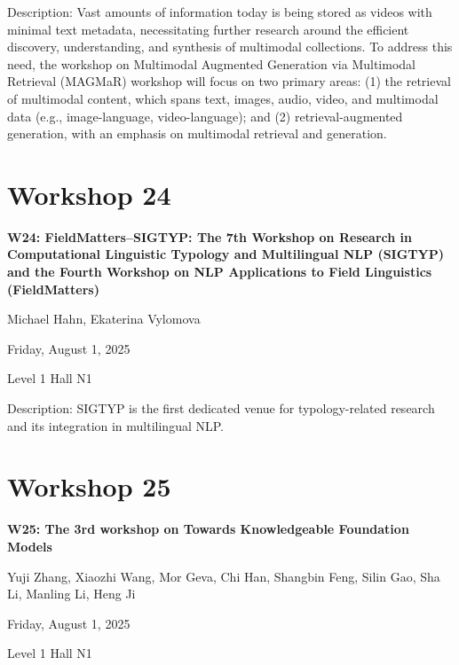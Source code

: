 Description: Vast amounts of information today is being stored as videos with minimal text metadata, necessitating further research around the efficient discovery, understanding, and synthesis of multimodal collections. To address this need, the workshop on Multimodal Augmented Generation via Multimodal Retrieval (MAGMaR) workshop will focus on two primary areas: (1) the retrieval of multimodal content, which spans text, images, audio, video, and multimodal data (e.g., image-language, video-language); and (2) retrieval-augmented generation, with an emphasis on multimodal retrieval and generation.

\clearpage


\section[W24: FieldMatters–SIGTYP: The 7th Workshop on Research in Computational Linguistic Typology and Multilingual NLP (SIGTYP) and the Fourth Workshop on NLP Applications to Field Linguistics (FieldMatters)]{Workshop 24}

\begin{center}
    {\Large \textbf{W24: FieldMatters–SIGTYP: The 7th Workshop on Research in Computational Linguistic Typology and Multilingual NLP (SIGTYP) and the Fourth Workshop on NLP Applications to Field Linguistics (FieldMatters)}}

Michael Hahn, Ekaterina Vylomova

    Friday, August 1, 2025

 Level 1 Hall N1
    
\end{center}

Description: SIGTYP is the first dedicated venue for typology-related research and its integration in multilingual NLP.

\clearpage


\section[W25: The 3rd workshop on Towards Knowledgeable Foundation Models]{Workshop 25}

\begin{center}
    {\Large \textbf{W25: The 3rd workshop on Towards Knowledgeable Foundation Models}}

Yuji Zhang, Xiaozhi Wang, Mor Geva, Chi Han, Shangbin Feng, Silin Gao, Sha Li, Manling Li, Heng Ji

    Friday, August 1, 2025

 Level 1 Hall N1
    
\end{center}

